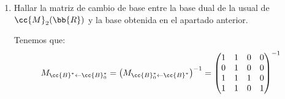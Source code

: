 \documentclass[12pt]{article}
\begin{document}
\begin{ejercicio}
\begin{enumerate}
		Sea ahora la base dual de la base usual, $\cc{B}_0^* = \{\varphi_{11}, \phi_{12}, \phi_{21}, \phi_{22}\}$, donde:
		\begin{gather*}
			\varphi_{ij}\begin{pmatrix}
				a_{11} & a_{12} \\
				a_{21} & a_{22}
			\end{pmatrix} = a_{ij}\qquad i,j \in \{1,2\}
		\end{gather*}

		En ese sistema de coordenadas, tenemos:
		\begin{gather*}
			\varphi \equiv (1,0,0,1)_{\cc{B}_0^*} \\
			\psi \equiv (1,1,1,1)_{\cc{B}_0^*}
		\end{gather*}
		
		Veamos ahora que $\{\varphi, \psi, \varphi_{21}, \varphi_{22}\}$ forman una base de $(\cc{M}_2(\bb{R}))^*$. \begin{align*}
			\begin{vmatrix}
				1 & 1 & 0 & 0 \\
				0 & 1 & 0 & 0 \\
				0 & 1 & 1 & 0 \\
				1 & 1 & 0 & 1
			\end{vmatrix} \neq 0
		\end{align*}
		Por lo tanto, $\cc{B}^*=\{\varphi, \psi, \varphi_{21}, \varphi_{22}\}$ es una base de $(\cc{M}_2(\bb{R}))^*$.
		\item Hallar la matriz de cambio de base entre la base dual de la usual de $\cc{M}_2(\bb{R})$ y la base obtenida en el apartado anterior.
		
		Tenemos que:
		\begin{align*}
			M_{\cc{B}^*\leftarrow \cc{B}_0^*} = \left(M_{\cc{B}_0^*\leftarrow \cc{B}^*}\right)^{-1}
			= \begin{pmatrix}
				1 & 1 & 0 & 0\\
				0 & 1 & 0 & 0\\
				1 & 1 & 1 & 0\\
				1 & 1 & 0 & 1
			\end{pmatrix}^{-1}
		\end{align*}


\end{enumerate}
\end{ejercicio}
\end{document}
